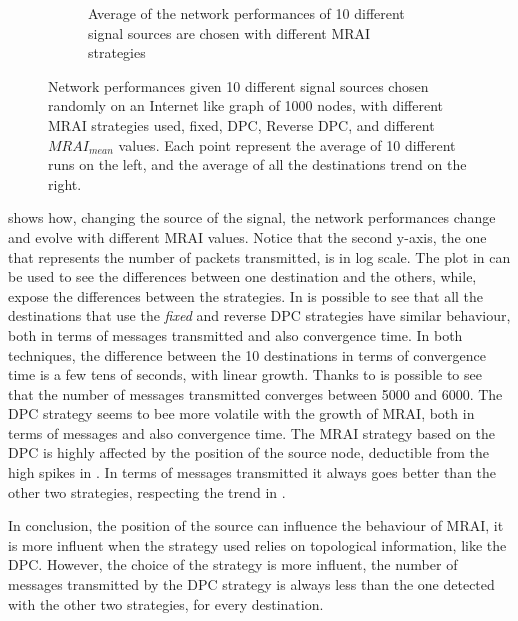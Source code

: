 \begin{figure}[h]
\begin{subfigure}[b]{0.49\textwidth}
		 \caption{Average of the network performances of \num{10} different
			signal sources are chosen with different \ac{MRAI} strategies}
         \label{fig:different_destinations_mean}
     \end{subfigure}
	 \caption{Network performances given \num{10} different signal sources chosen
		randomly on an Internet like graph of \num{1000} nodes, with different
		\ac{MRAI} strategies used, fixed, \ac{DPC}, Reverse \ac{DPC}, and
		different \(MRAI_{mean}\) values. Each point represent the average of
		\num{10} different runs on the left, and the average of all the destinations
		trend on the right.}
	 \label{fig:different_destinations}
\end{figure}

 shows how, changing the source of the signal,
the network performances change and evolve with different \ac{MRAI} values.
Notice that the second y-axis, the one that represents the number of packets
transmitted, is in log scale.
The plot in  can be used to see the
differences between one destination and the others, while, 
expose the differences between the strategies.
In  is possible to see that all the destinations
that use the \textit{fixed} and reverse \ac{DPC} strategies have similar behaviour,
both in terms of messages transmitted and also convergence time.
In both techniques, the difference between the \num{10} destinations in terms of
convergence time is a few tens of seconds, with linear growth.
Thanks to  is possible to see that the
number of messages transmitted converges between \num{5000} and \num{6000}.
The \ac{DPC} strategy seems to bee more volatile with the growth of \ac{MRAI},
both in terms of messages and also convergence time.
The \ac{MRAI} strategy based on the \ac{DPC} is highly affected by the position
of the source node, deductible from the high spikes in .
In terms of messages transmitted it always goes better than
the other two strategies, respecting the trend in .

In conclusion, the position of the source can influence the behaviour
of \ac{MRAI}, it is more influent when the strategy used relies on topological
information, like the \ac{DPC}.
However, the choice of the strategy is more influent, the number of messages transmitted
by the \ac{DPC} strategy is always less than the one detected with the other
two strategies, for every destination.

